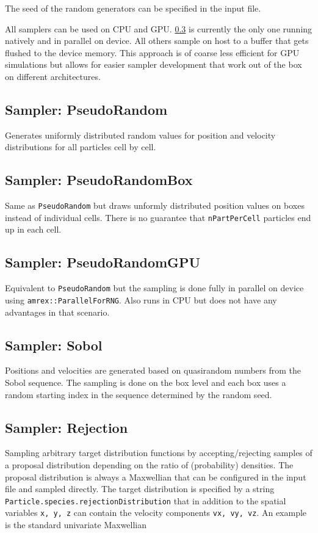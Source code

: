 \documentclass[11pt]{article}
\begin{document}
The seed of the random generators can be specified in the input file.

\begin{note}
    All samplers can be used on CPU and GPU. \ref{sec:sampler_pseudorandomGPU} is currently the only one running natively and in parallel on device. All others sample on host to a buffer that gets flushed to the device memory. This approach is of coarse less efficient for GPU simulations but allows for easier sampler development that work out of the box on different architectures.
\end{note}

\subsection{Sampler: PseudoRandom}
Generates uniformly distributed random values for position and velocity distributions for all particles cell by cell.

\subsection{Sampler: PseudoRandomBox}
Same as \verb|PseudoRandom| but draws unformly distributed position values on boxes instead of individual cells. There is no guarantee that \verb|nPartPerCell| particles end up in each cell.

\subsection{Sampler: PseudoRandomGPU}
\label{sec:sampler_pseudorandomGPU}
Equivalent to \verb|PseudoRandom| but the sampling is done fully in parallel on device using \verb|amrex::ParallelForRNG|. Also runs in CPU but does not have any advantages in that scenario.

\subsection{Sampler: Sobol}
Positions and velocities are generated based on quasirandom numbers from the Sobol sequence. The sampling is done on the box level and each box uses a random starting index in the sequence determined by the random seed.

\subsection{Sampler: Rejection}
Sampling arbitrary target distribution functions by accepting/rejecting samples of a proposal distribution depending on the ratio of (probability) densities. The proposal distribution is always a Maxwellian that can be configured in the input file and sampled directly. The target distribution is specified by a string \verb|Particle.species.rejectionDistribution| that in addition to the spatial variables \verb|x, y, z| can contain the velocity components \verb|vx, vy, vz|. An example is the standard univariate Maxwellian
\end{document}

